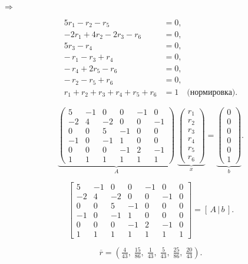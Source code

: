$\Rightarrow$

\[
	\begin{aligned}
		5r_1 - r_2 - r_5          & = 0,                           \\
		-2r_1 + 4r_2 - 2r_3 - r_6 & = 0,                           \\
		5r_3 - r_4                & = 0,                           \\
		-\,r_1 - r_3 + r_4        & = 0,                           \\
		-\,r_4 + 2r_5 - r_6       & = 0,                           \\
		-\,r_2 - r_5 + r_6        & = 0,                           \\
		r_1+r_2+r_3+r_4+r_5+r_6   & = 1 \quad \text{(нормировка).}
	\end{aligned}
\]


\[
	\underbrace{
		\begin{pmatrix}
			5  & -1 & 0  & 0  & -1 & 0  \\
			-2 & 4  & -2 & 0  & 0  & -1 \\
			0  & 0  & 5  & -1 & 0  & 0  \\
			-1 & 0  & -1 & 1  & 0  & 0  \\
			0  & 0  & 0  & -1 & 2  & -1 \\
			1  & 1  & 1  & 1  & 1  & 1
		\end{pmatrix}}_{\displaystyle A}
	\;
	\underbrace{
		\begin{pmatrix}
			r_1 \\ r_2\\ r_3\\ r_4\\ r_5\\ r_6
		\end{pmatrix}}_{\displaystyle x}
	=
	\underbrace{
		\begin{pmatrix}
			0 \\ 0\\ 0\\ 0\\ 0\\ 1
		\end{pmatrix}}_{\displaystyle b}.
\]

\[
	\left[
		\begin{array}{rrrrrr|r}
			5  & -1 & 0  & 0  & -1 & 0  & 0 \\
			-2 & 4  & -2 & 0  & 0  & -1 & 0 \\
			0  & 0  & 5  & -1 & 0  & 0  & 0 \\
			-1 & 0  & -1 & 1  & 0  & 0  & 0 \\
			0  & 0  & 0  & -1 & 2  & -1 & 0 \\
			1  & 1  & 1  & 1  & 1  & 1  & 1
		\end{array}
		\right]=[\,A\,|\,b\,].
\]

\[
	\overline r =
	\left(\tfrac{4}{43},\;\tfrac{15}{86},\;\tfrac{1}{43},\;\tfrac{5}{43},\;\tfrac{25}{86},\;\tfrac{20}{43}\right).
\]